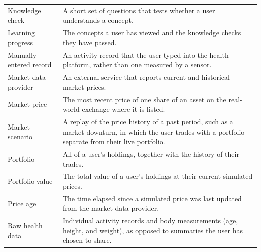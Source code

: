 \documentclass[12pt]{article}
\begin{document}
\begin{longtable}{>{\raggedright\arraybackslash}p{} p{}}
  Knowledge check                                    & A short set of questions that tests whether a user understands a concept.                                                                                               \\
  Learning progress                                  & The concepts a user has viewed and the knowledge checks they have passed.                                                                                               \\
  Manually entered record                            & An activity record that the user typed into the health platform, rather than one measured by a sensor.                                                                  \\
  Market data provider                               & An external service that reports current and historical market prices.                                                                                                  \\
  Market price                                       & The most recent price of one share of an asset on the real-world exchange where it is listed.                                                                           \\
  Market scenario                                    & A replay of the price history of a past period, such as a market downturn, in which the user trades with a portfolio separate from their live portfolio.                \\
  Portfolio                                          & All of a user's holdings, together with the history of their trades.                                                                                                    \\
  Portfolio value                                    & The total value of a user's holdings at their current simulated prices.                                                                                                 \\
  Price age                                          & The time elapsed since a simulated price was last updated from the market data provider.                                                                                \\
  Raw health data                                    & Individual activity records and body measurements (age, height, and weight), as opposed to summaries the user has chosen to share.                                      \\

\end{longtable}
\end{document}

